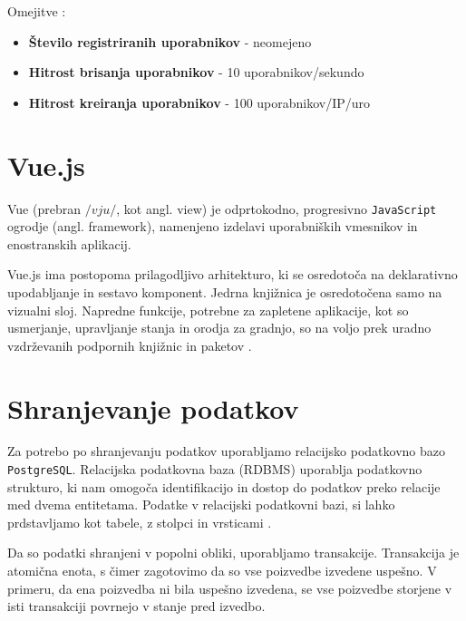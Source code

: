 \documentclass[a4paper, 12pt]{book}
\begin{document}
\begin{description}
\item Omejitve \cite{firebase-limits}:
	\begin{itemize}
		\item \textbf{Število registriranih uporabnikov} - neomejeno
		\item \textbf{Hitrost brisanja uporabnikov} - 10 uporabnikov/sekundo
		\item \textbf{Hitrost kreiranja uporabnikov} - 100 uporabnikov/IP/uro
	\end{itemize}
\end{description}


\section{Vue.js}
\label{vue-js-section}
Vue (prebran $/vju/$, kot angl. view) je odprtokodno, progresivno \verb=JavaScript= ogrodje (angl. framework), namenjeno izdelavi uporabniških vmesnikov in enostranskih aplikacij.

Vue.js ima postopoma prilagodljivo arhitekturo, ki se osredotoča na deklarativno upodabljanje in sestavo komponent. Jedrna knjižnica je osredotočena samo na vizualni sloj. Napredne funkcije, potrebne za zapletene aplikacije, kot so usmerjanje, upravljanje stanja in orodja za gradnjo, so na voljo prek uradno vzdrževanih podpornih knjižnic in paketov \cite{vue-js-what-is}.

\clearpage
\section{Shranjevanje podatkov}
Za potrebo po shranjevanju podatkov uporabljamo relacijsko podatkovno bazo \verb=PostgreSQL=. Relacijska podatkovna baza (RDBMS) uporablja podatkovno strukturo, ki nam omogoča identifikacijo in dostop do podatkov preko relacije med dvema entitetama. Podatke v relacijski podatkovni bazi, si lahko prdstavljamo kot tabele, z stolpci in vrsticami \cite{oracle-rdbms}.

Da so podatki shranjeni v popolni obliki, uporabljamo transakcije. Transakcija je atomična enota, s čimer zagotovimo da so vse poizvedbe izvedene uspešno. V primeru, da ena poizvedba ni bila uspešno izvedena, se vse poizvedbe storjene v isti transakciji povrnejo v stanje pred izvedbo. 

\end{document}
